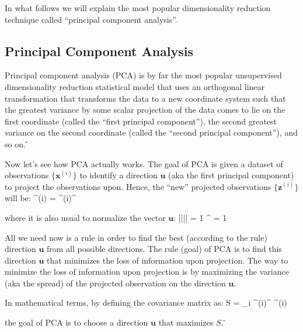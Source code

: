 In what follows we will explain the most popular dimensionality reduction technique called ``principal component 
analysis''.

\subsection{Principal Component Analysis}

Principal component analysis (PCA) is by far the most popular unsupervised dimensionality reduction statistical model
that uses an orthogonal linear transformation that transforms the data to a new coordinate system such that the 
greatest variance by some scalar projection of the data comes to lie on the first coordinate (called the ``first 
principal component''), the second greatest variance on the second coordinate (called the ``second principal
component''), and so on. \v


Now let's see how PCA actually works. The goal of PCA is given a dataset of observations $\{\boldsymbol{x}^{(i)}\}$ 
to identify a direction $\boldsymbol{u}$ (aka the first principal component) to project the observations upon. Hence,
the ``new'' projected observations $\{\boldsymbol{z}^{(i)}\}$ will be:
\bse
{}^{(i)} = {^{(i)}}^{\intercal} 
\ese

where it is also usual to normalize the vector $\boldsymbol{u}$:
\bse
|||| = 1 \Rightarrow {}^{\intercal}  = 1
\ese

All we need now is a rule in order to find the best (according to the rule) direction $\boldsymbol{u}$ from all 
possible directions. The rule (goal) of PCA is to find this direction $\boldsymbol{u}$ that minimizes the loss of 
information upon projection. The way to minimize the loss of information upon projection is by maximizing the 
variance (aka the spread) of the projected observation on the direction $\boldsymbol{u}$.


In mathematical terms, by defining the covariance matrix as:
\bse
S =  \sum_{i} {^{(i)}}^{\intercal} ^{(i)}
\ese

the goal of PCA is to choose a direction $\boldsymbol{u}$ that maximizes $S$. \v

